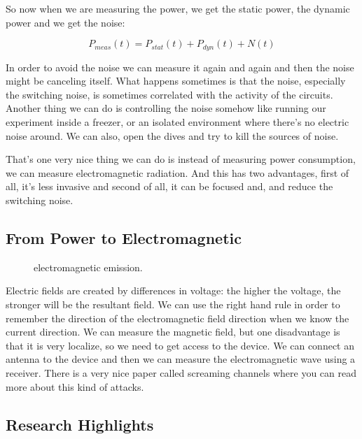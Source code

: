 So now when we are measuring the power, we get the static power, the dynamic
power and we get the noise:

\begin{displaymath}
    P_{meas}(t)=P_{stat}(t) + P_{dyn}(t) + N(t)
\end{displaymath}

In order to avoid the noise we can measure it again and again and then the noise
might be canceling itself. What happens sometimes is that the noise, especially
the switching noise, is sometimes correlated with the activity of the circuits.
Another thing we can do is controlling the noise somehow like running our
experiment inside a freezer, or an isolated environment where there's no
electric noise around. We can also, open the dives and try to kill the sources
of noise.

That's one very nice thing we can do is instead of measuring power consumption,
we can measure electromagnetic radiation. And this has two advantages, first of
all, it's less invasive and second of all, it can be focused and, and reduce the
switching noise.

\subsection { From Power to Electromagnetic }

\begin{figure}[!ht]
    \centering
    
    \caption{electromagnetic emission.} \label{fig:electromagnetic emission}
\end{figure}

Electric fields are created by differences in voltage: the higher the voltage,
the stronger will be the resultant field. We can use the right hand rule in
order to remember the direction of the electromagnetic field direction when we
know the current direction. We can measure the magnetic field, but one
disadvantage is that it is very localize, so we need to get access to the
device. We can connect an antenna to the device and then we can measure the
electromagnetic wave using a receiver. There is a very nice paper called
screaming channels where you can read more about this kind of attacks.

\subsection { Research Highlights }

